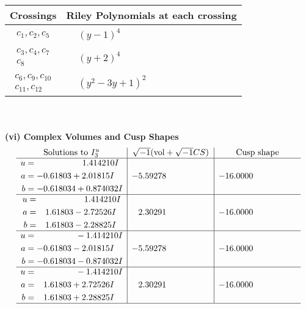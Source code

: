 \documentclass[1p]{elsarticle_modified}
\theoremstyle{definition}
\newcommand{\I}{\sqrt{-1}}
\begin{document}
\begin{tabular}{m{50pt}|m{274pt}}
Crossings & \hspace{64pt}Riley Polynomials at each crossing \\
\hline $$\begin{aligned}c_{1},c_{2},c_{5}\end{aligned}$$&$\begin{aligned}
&(y-1)^4
\end{aligned}$\\
\hline $$\begin{aligned}c_{3},c_{4},c_{7}\\c_{8}\end{aligned}$$&$\begin{aligned}
&(y+2)^4
\end{aligned}$\\
\hline $$\begin{aligned}c_{6},c_{9},c_{10}\\c_{11},c_{12}\end{aligned}$$&$\begin{aligned}
&(y^2-3 y+1)^2
\end{aligned}$\\
\hline
\end{tabular}\\~\\
\newpage\flushleft \textbf{(vi) Complex Volumes and Cusp Shapes}
$$\begin{array}{c|c|c}  
\text{Solutions to }I^u_{3}& \I (\text{vol} + \sqrt{-1}CS) & \text{Cusp shape}\\
 \hline 
\begin{aligned}
u &= \phantom{-0.000000 -}1.414210 I \\
a &= -0.61803 + 2.01815 I \\
b &= -0.618034 + 0.874032 I\end{aligned}
 & -5.59278\phantom{ +0.000000I} & -16.0000\phantom{ +0.000000I} \\ \hline\begin{aligned}
u &= \phantom{-0.000000 -}1.414210 I \\
a &= \phantom{-}1.61803 - 2.72526 I \\
b &= \phantom{-}1.61803 - 2.28825 I\end{aligned}
 & \phantom{-}2.30291\phantom{ +0.000000I} & -16.0000\phantom{ +0.000000I} \\ \hline\begin{aligned}
u &= \phantom{-0.000000 } -1.414210 I \\
a &= -0.61803 - 2.01815 I \\
b &= -0.618034 - 0.874032 I\end{aligned}
 & -5.59278\phantom{ +0.000000I} & -16.0000\phantom{ +0.000000I} \\ \hline\begin{aligned}
u &= \phantom{-0.000000 } -1.414210 I \\
a &= \phantom{-}1.61803 + 2.72526 I \\
b &= \phantom{-}1.61803 + 2.28825 I\end{aligned}
 & \phantom{-}2.30291\phantom{ +0.000000I} & -16.0000\phantom{ +0.000000I}\\
 \hline 
 \end{array}$$\newpage\newpage\renewcommand{\arraystretch}{1}
\end{document}
